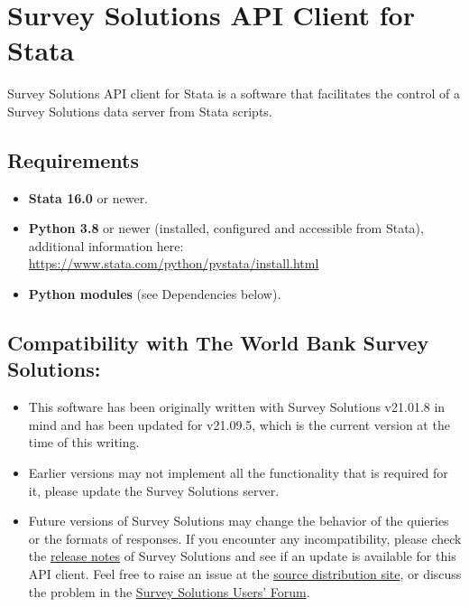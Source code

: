 \section{Survey Solutions API Client for Stata}

\vskip16pt
Survey Solutions API client for Stata is a software that facilitates the
control of a Survey Solutions data server from Stata scripts.

\vskip16pt
\subsection{Requirements}

\begin{itemize}
    \item \textbf{Stata 16.0} or newer.
    \item \textbf{Python 3.8} or newer (installed, configured and accessible from Stata), additional information here: \href{https://www.stata.com/python/pystata/install.html}{https://www.stata.com/python/pystata/install.html}
    \item \textbf{Python modules} (see Dependencies below).
\end{itemize}

\vskip16pt
\subsection{Compatibility with The World Bank Survey Solutions:}
\begin{itemize}
  \item This software has been originally written with Survey Solutions
        v21.01.8 in mind and has been updated for v21.09.5, which is the
        current version at the time of this writing.
  \item Earlier versions may not implement all the functionality that is
        required for it, please update the Survey Solutions server.
  \item Future versions of Survey Solutions may change the behavior of the
        quieries or the formats of responses. If you encounter any
        incompatibility, please check the
        \href{https://docs.mysurvey.solutions/release_notes}{release notes} of Survey Solutions and see if an update is available for this
        API client. Feel free to raise an issue at the
        \href{https://github.com/radyakin/susoapi}{source distribution
        site}, or discuss the problem in the
        \href{https://forum.mysurvey.solutions}{Survey Solutions Users' Forum}.
\end{itemize}

